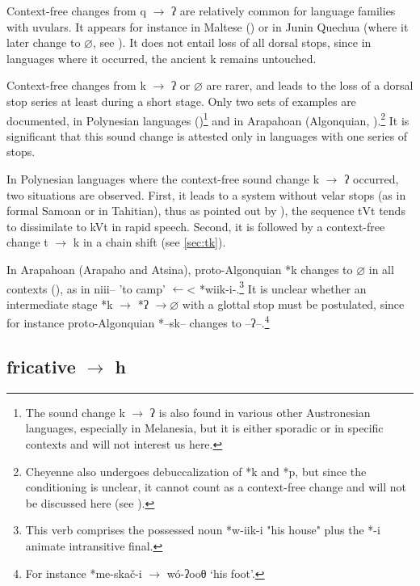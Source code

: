 \documentclass[oldfontcommands,oneside,a4paper,11pt]{article}
\newcommand{\ipa}[1]{{\phon \mbox{#1}}} %
\begin{document}
Context-free changes from \ipa{q} $\rightarrow$  \ipa{ʔ} are relatively common for language families with uvulars. It appears for instance in Maltese (\citealt[107]{kuemmel07wandel}) or in Junin Quechua (where it later change to $\varnothing$, see \citealt[202]{adelaar04andes}). It does not entail loss of all dorsal stops, since in   languages where it occurred, the ancient \ipa{k} remains untouched.

Context-free changes from \ipa{k} $\rightarrow$  \ipa{ʔ} or $\varnothing$ are rarer, and leads to the loss of a dorsal stop series at least during a short stage. Only two sets of examples are documented, in Polynesian languages (\citealt{blust04tk})\footnote{The sound change \ipa{k} $\rightarrow$  \ipa{ʔ}  is also found in various other Austronesian languages, especially in Melanesia, but it is either sporadic or in specific contexts and will not interest us here.} and in Arapahoan (Algonquian, \citealt{goddard74arapaho}).\footnote{Cheyenne also undergoes debuccalization of *\ipa{k} and *\ipa{p}, but since the conditioning is unclear, it cannot count as a context-free change and will not be discussed here (see \citet{goddard88cheyenne.y}). } It is significant that this sound change is attested only in languages with one series of stops. 

In   Polynesian languages  where the context-free sound change \ipa{k} $\rightarrow$  \ipa{ʔ} occurred, two situations are observed. First, it leads to a system without velar stops (as in formal Samoan or in Tahitian), thus as pointed out by \citet[370-371]{blust04tk}), the sequence tVt tends to dissimilate to kVt in rapid speech. Second, it is followed by a context-free change \ipa{t} $\rightarrow$  \ipa{k} in a chain shift (see \ref{sec:tk}).

In Arapahoan (Arapaho and Atsina), proto-Algonquian *\ipa{k} changes to $\varnothing$ in all contexts (\citealt[107]{goddard74arapaho}), as in \ipa{niii--}  'to camp' $\leftarrow$< *\ipa{wiik-i-}.\footnote{This verb comprises the possessed noun *\ipa{w-iik-i} "his house" plus the *\ipa{-i} animate intransitive final.} It is unclear whether an intermediate stage *\ipa{k} $\rightarrow$  *\ipa{ʔ} $\rightarrow \varnothing$ with a glottal stop must be postulated, since for instance proto-Algonquian *--\ipa{sk}-- changes to --\ipa{ʔ}--.\footnote{For instance *\ipa{me-skač-i} $\rightarrow$ \ipa{wó-ʔooθ} `his foot'.}

 
 
 

  \subsection{fricative  $\rightarrow$  \ipa{h}}  \label{sec:fric.h}
\citet[102-106]{kuemmel07wandel}
\end{document}

